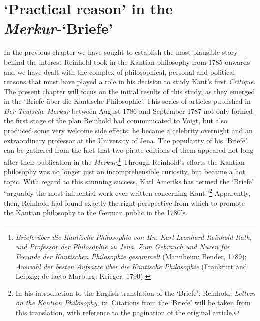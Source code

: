 
\chapter{`Practical reason' in the \textit{Merkur}{-}`Briefe'}


In the previous chapter we have sought to establish the most plausible story behind the interest Reinhold took in the Kantian philosophy from 1785 onwards and we have dealt with the complex of philosophical, personal and political reasons that must have played a role in his decision to study Kant's first \textit{Critique}. The present chapter will focus on the initial results of this study, as they emerged in the `Briefe \"{u}ber die Kantische Philosophie'. This series of articles published in \textit{Der Teutsche Merkur} between August 1786 and September 1787 not only formed the first stage of the plan Reinhold had communicated to Voigt, but also produced some very welcome side effects: he became a celebrity overnight and an extraordinary professor at the University of Jena. The popularity of his `Briefe' can be gathered from the fact that two pirate editions of them appeared not long after their publication in the \textit{Merkur}.\footnote{ \textit{Briefe \"{u}ber die Kantische Philosophie von Hn. Karl Leonhard Reinhold Rath, und Professor der Philosophie zu Jena. Zum Gebrauch und Nuzen f\"{u}r Freunde der Kantischen Philosophie gesammelt} (Mannheim: Bender, 1789); \textit{Auswahl der besten Aufs\"{a}zze \"{u}ber die Kantische Philosophie} (Frankfurt and Leipzig; de facto Marburg: Krieger, 1790). } Through Reinhold's efforts the Kantian philosophy was no longer just an incomprehensible curiosity, but became a hot topic. With regard to this stunning success, Karl Ameriks has termed the `Briefe' ``arguably the most influential work ever written concerning Kant.''\footnote{ In his introduction to the English translation of the `Briefe': Reinhold, \textit{Letters on the Kantian Philosophy}, ix. Citations from the `Briefe' will be taken from this translation, with reference to the pagination of the original article. } Apparently, then, Reinhold had found exactly the right perspective from which to promote the Kantian philosophy to the German public in the 1780's. 

